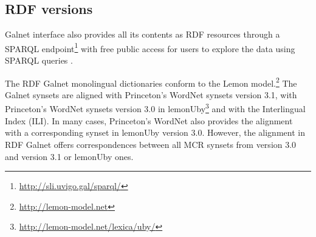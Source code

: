 \documentclass[runningheads]{llncs}
\begin{document}


\subsection{RDF versions}

Galnet interface also provides all its contents as RDF resources through a SPARQL endpoint\footnote{\url{http://sli.uvigo.gal/sparql/}}  with free public access for users to explore the data using SPARQL queries \cite{dbpedia2016}. 

The RDF Galnet monolingual dictionaries conform to the Lemon model.\footnote{\url{http://lemon-model.net}} The Galnet synsets are aligned with Princeton's WordNet synsets version 3.1, with Princeton's WordNet synsets version 3.0 in lemonUby\footnote{\url{http://lemon-model.net/lexica/uby/}}   and with the Interlingual Index (ILI). In many cases, Princeton's WordNet also provides the alignment with a corresponding synset in lemonUby version 3.0. However, the alignment in RDF Galnet offers correspondences between all MCR synsets from version 3.0 and version 3.1 or lemonUby ones.
\end{document}
